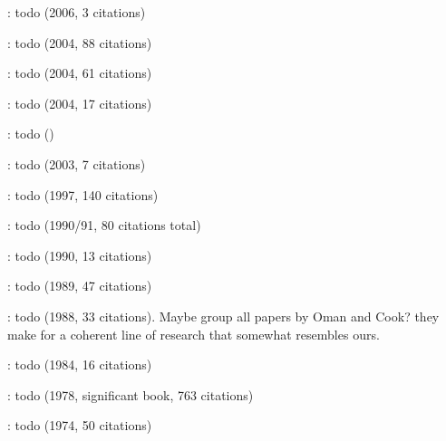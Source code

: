 \cite{kondoh2006use}: todo (2006, 3 citations)

\cite{ala2004supporting}: todo (2004, 88 citations)

\cite{ding2004extraction}: todo (2004, 61 citations)

\cite{mohan2004programming}: todo (2004, 17 citations)

\cite{ding2004extraction}: todo ()

\cite{tham2003cilk}: todo (2003, 7 citations)

\cite{krsul1997authorship}: todo (1997, 140 citations)

\cite{oman1990taxonomy, oman1991programming}: todo (1990/91, 80 citations total)

\cite{petre1990languages}: todo (1990, 13 citations)

\cite{oman1989programming}: todo (1989, 47 citations)

\cite{oman1988paradigm}: todo (1988, 33 citations). Maybe group all papers by Oman and Cook? they make for a coherent line of research that somewhat  resembles ours.

\cite{evangelist1984program}: todo (1984, 16 citations)

\cite{kernighan1978elements}: todo (1978, significant book, 763 citations)

\cite{kernighan1974programming}: todo (1974, 50 citations)

















